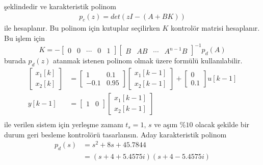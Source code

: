 şeklindedir ve karakteristik polinom
\begin{equation}
    \begin{split}
        p_c(z)=det(zI-(A+BK))
    \end{split}
\end{equation}
ile hesaplanır. Bu polinom için kutuplar seçilirken $K$ kontrolör matrisi hesaplanır. Bu işlem için
\begin{equation}
    K=-\begin{bmatrix}0& 0& \cdots& 0& 1\end{bmatrix}\begin{bmatrix}B& AB& \cdots& A^{n-1}B\end{bmatrix}^{-1}p_d(A)
\end{equation}
burada $p_d(z)$ atanmak istenen polinom olmak üzere formülü kullanılabilir. 
\begin{equation}
    \begin{split}
\begin{bmatrix}
    x_1[k]\\
    x_2[k]
\end{bmatrix}&=
\begin{bmatrix}
    1& 0.1\\
    -0.1& 0.95
\end{bmatrix}\begin{bmatrix}
    x_1[k-1]\\
    x_2[k-1]
\end{bmatrix}+\begin{bmatrix}
    0\\
    0.1
\end{bmatrix}u[k-1]\\
y[k-1]&=\begin{bmatrix}
    1&0 
\end{bmatrix}\begin{bmatrix}
    x_1[k-1]\\
    x_2[k-1]
\end{bmatrix}\\
\end{split}
\end{equation}
ile verilen sistem için yerleşme zamanı $t_s=1,\,s$ ve aşım $\%10$ olacak şekilde bir durum geri besleme kontrolörü tasarlansın. Aday karakteristik polinom 
\begin{equation}
\begin{split}
    p_d(s)&=s^2+8s+45.7844\\
    &=(s+4 + 5.4575i)(s+4 - 5.4575i)
\end{split}
\end{equation}
